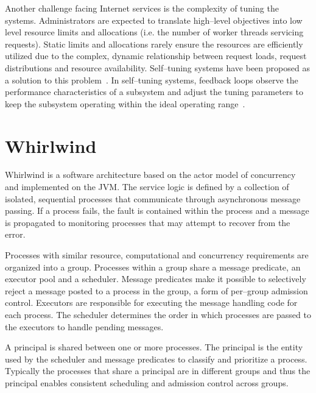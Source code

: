 \documentclass[conference]{IEEEtran}
\begin{document}
Another challenge facing Internet services is the complexity of tuning the systems. Administrators are expected to translate high--level objectives into low level resource limits and allocations (i.e. the number of worker threads servicing requests). Static limits and allocations rarely ensure the resources are efficiently utilized due to the complex, dynamic relationship between request loads, request distributions and resource availability. Self--tuning systems have been proposed as a solution to this problem~\cite{IBM01Autonomic}. In self--tuning systems, feedback loops observe the performance characteristics of a subsystem and adjust the tuning parameters to keep the subsystem operating within the ideal operating range~\cite{welsh03Adaptive}.

\section{Whirlwind}

Whirlwind is a software architecture based on the actor model of concurrency and implemented on the JVM. The service logic is defined by a collection of isolated, sequential processes that communicate through asynchronous message passing. If a process fails, the fault is contained within the process and a message is propagated to monitoring processes that may attempt to recover from the error.

Processes with similar resource, computational and concurrency requirements are organized into a group. Processes within a group share a message predicate, an executor pool and a scheduler. Message predicates make it possible to selectively reject a message posted to a process in the group, a form of per--group admission control. Executors are responsible for executing the message handling code for each process. The scheduler determines the order in which processes are passed to the executors to handle pending messages.

A principal is shared between one or more processes. The principal is the entity used by the scheduler and message predicates to classify and prioritize a process. Typically the processes that share a principal are in different groups and thus the principal enables consistent scheduling and admission control across groups.

\end{document}
